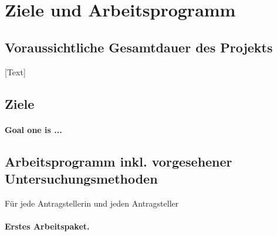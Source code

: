 \documentclass{scrartcl}
\begin{document}
\section{Ziele und Arbeitsprogramm}

\subsection{Voraussichtliche Gesamtdauer des Projekts}
[Text]

\subsection{Ziele}
\let\oldpara=\theparagraph
\addtocounter{secnumdepth}{1}
\renewcommand{\theparagraph}{Ziel \arabic{paragraph}}

\paragraph{\textnormal{Goal one is ...}}

\subsection{Arbeitsprogramm inkl. vorgesehener Untersuchungsmethoden}

\addtocounter{secnumdepth}{1}
\renewcommand{\theparagraph}{AP\arabic{paragraph}}

Für jede Antragstellerin und jeden Antragsteller

\hrulefill
\paragraph{Erstes Arbeitspaket.}
\label{wp:1}
\end{document}
